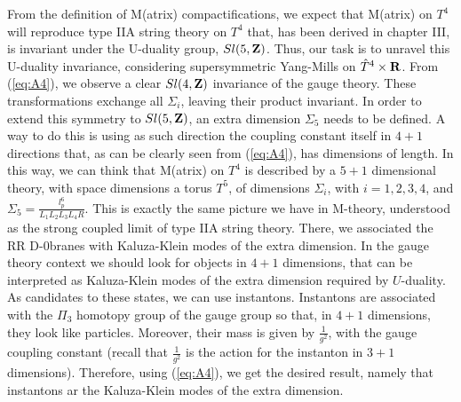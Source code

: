From the definition of M(atrix)
compactifications, we expect that M(atrix) on $T^4$ will
reproduce type IIA string theory on $T^4$ that, has been derived
in chapter III, is invariant under the U-duality group,
$Sl(5,{\bf Z})$. Thus, our task is to unravel this U-duality
invariance, considering supersymmetric Yang-Mills on $\hat{T}^4
\times {\bf R}$. From (\ref{eq:A4}), we observe a clear
$Sl(4,{\bf Z})$ invariance of the gauge theory. These
transformations exchange all $\Sigma_i$, leaving their product
invariant. In order to extend this symmetry to $Sl(5,{\bf Z})$,
an extra dimension $\Sigma_5$ needs to be defined. A way to do
this is using as such direction the coupling constant itself in
$4+1$ directions that, as can be clearly seen from
(\ref{eq:A4}), has dimensions of length. In this way, we can
think that M(atrix) on $T^4$ is described by a $5+1$ dimensional
theory, with space dimensions a torus $T^5$, of dimensions
$\Sigma_i$, with $i=1,2,3,4$, and $\Sigma_5=\frac
{l_p^6}{L_1L_2L_3L_4 R}$. This is exactly the same picture we
have in M-theory, understood as the strong coupled limit of type
IIA string theory. There, we associated the RR D-$0$branes with
Kaluza-Klein modes of the extra dimension. In the gauge theory
context we should look for objects in $4+1$ dimensions, that can
be interpreted as Kaluza-Klein modes of the extra dimension
required by $U$-duality. As candidates to these states, we can
use instantons. Instantons are associated with the $\Pi_3$
homotopy group of the gauge group so that, in $4+1$ dimensions,
they look like particles. Moreover, their mass is given by $\frac
{1}{g^2}$, with the gauge coupling constant (recall that $\frac
{1}{g^2}$ is the action for the instanton in $3+1$ dimensions).
Therefore, using (\ref{eq:A4}), we get the desired result,
namely that instantons ar the Kaluza-Klein modes of the extra
dimension.
  
